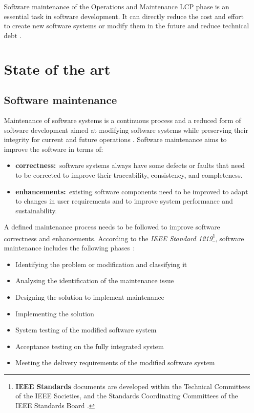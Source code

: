 Software maintenance of the Operations and Maintenance LCP phase is an essential task in software development. It can directly reduce the cost and effort to create new software systems or modify them in the future and reduce technical debt \cite{Thamburaj2017, DeLeon-Sigg2020}.

\clearpage

\section{State of the art}

\subsection{Software maintenance}\label{sec:ch1_softwareMaintenanceIntro}{}
Maintenance of software systems is a continuous process and a reduced form of software development aimed at modifying software systems while preserving their integrity for current and future operations \cite{Sneed2004, Ackermann2009, Port2017}. Software maintenance aims to improve the software in terms of:

\begin{itemize}
	\item \textbf{correctness:}~software systems always have some defects or faults that need to be corrected to improve their traceability, consistency, and completeness.
	\item \textbf{enhancements:}\RaggedRight~existing software components need to be improved to adapt to changes in user requirements and to improve system performance and sustainability.
\end{itemize}

A defined maintenance process needs to be followed to improve software correctness and enhancements. According to the \textit{IEEE Standard 1219}\footnote{\textbf{IEEE Standards} documents are developed within the Technical Committees of the IEEE Societies, and the Standards Coordinating Committees of the IEEE Standards Board \cite{Mamone1994}.}, software maintenance includes the following phases \cite{Mamone1994, Hasan2012, Stojanov2017}:

\begin{itemize}
	\item Identifying the problem or modification and classifying it
	\item Analysing the identification of the maintenance issue
	\item Designing the solution to implement maintenance
	\item Implementing the solution
	\item System testing of the modified software system
	\item Acceptance testing on the fully integrated system
	\item Meeting the delivery requirements of the modified software system
\end{itemize}

